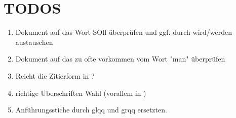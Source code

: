 \documentclass[12pt]{report}           %
\begin{document}


\chapter*{TODOS}
\begin{enumerate}
    \item Dokument auf das Wort SOll überprüfen und ggf. durch wird/werden austauschen
    \item Dokument auf das zu ofte vorkommen vom Wort "man" überprüfen
    \item Reicht die Zitierform in  ?
    \item richtige Überschriften Wahl (vorallem in )
    \item Anführungsstiche durch glqq{} und grqq{} ersetzten.
\end{enumerate}



\setcounter{page}{1}



\clearpage{}











\baselineskip=14pt


\appendix
\baselineskip=18pt

\end{document}
